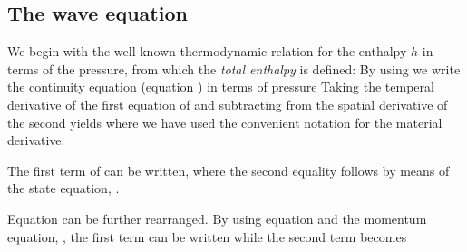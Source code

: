 \subsection{The wave equation}
We begin with the well known thermodynamic relation for the enthalpy $h$ in terms of the pressure,
from which the {\em total enthalpy} is defined:
By using  we write the continuity equation (equation ) in terms of pressure
Taking the temperal derivative of the first equation of  and subtracting from the spatial derivative of the second yields
where we have used the convenient notation
for the material derivative.


The first term of  can be written,
where the second equality follows by means of the state equation, .

Equation  can be further rearranged.
By using equation  and the momentum equation, , the first term can be written
while the second term becomes

